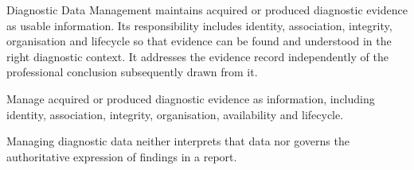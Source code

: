 Diagnostic Data Management maintains acquired or produced diagnostic evidence as usable information. Its responsibility includes identity, association, integrity, organisation and lifecycle so that evidence can be found and understood in the right diagnostic context. It addresses the evidence record independently of the professional conclusion subsequently drawn from it.



Manage acquired or produced diagnostic evidence as information, including identity, association, integrity, organisation, availability and lifecycle.



Managing diagnostic data neither interprets that data nor governs the authoritative expression of findings in a report.


